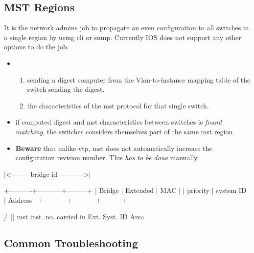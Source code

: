 \subsection{MST Regions}

It is the network admins job to propagate an even configuration to all switches in a single region by using \gls{cli} or \gls{snmp}. Currently IOS does not support any other options to do the job.

\begin{itemize}
    \item {}
    \begin{enumerate}
        \item sending a digest computer from the Vlan-to-instance mapping table of the switch sending the digest.
        \item the characteristics of the \gls{mst} protocol for that single switch.
    \end{enumerate}
    \item if computed digest and \gls{mst} characteristics between switches is \textit{found matching}, the switches considers themselves part of the same \gls{mst} region.
    \item \textbf{Beware} that unlike \gls{vtp}, \gls{mst} does not automatically increase the configuration revision number. This \textit{has to be done} manually.
\end{itemize}



\pagebreak %

\begin{txt}
    |<-------- bridge id ----------->|
    
    +----------+-----------+---------+
    | Bridge   | Extended  | MAC     |
    | priority | system ID | Address |
    +----------+-----------+---------+
    
    /\
    ||
    \gls{mst} inst. no. carried in
    Ext. Syst. ID Area
\end{txt}

\subsection{Common Troubleshooting}

